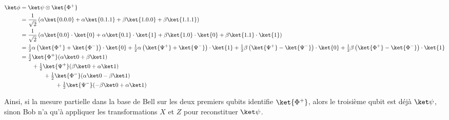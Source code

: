 \documentclass[11pt,class=report,crop=false]{standalone}
\begin{document}
\begin{align*}
\ket \phi 
  &= \ket\psi \otimes \ket{\Phi^+} \\
  &= \frac{1}{\sqrt2}\left( \alpha\ket{0.0.0} + \alpha\ket{0.1.1} + \beta\ket{1.0.0} + \beta\ket{1.1.1} \right) \\
  &= \frac{1}{\sqrt2}\left( \alpha\ket{0.0}\cdot\ket{0} + \alpha\ket{0.1}\cdot\ket{1} + \beta\ket{1.0}\cdot\ket{0} + \beta\ket{1.1}\cdot\ket{1} \right) \\  
  &= \tfrac12\alpha\left( \ket{\Phi^+}+\ket{\Phi^-} \right)\cdot\ket{0} 
  + \tfrac12\alpha\left( \ket{\Psi^+}+\ket{\Psi^-} \right)\cdot\ket{1} 
  + \tfrac12\beta\left( \ket{\Psi^+}-\ket{\Psi^-} \right)\cdot\ket{0} 
  + \tfrac12\beta\left( \ket{\Phi^+}-\ket{\Phi^-} \right)\cdot\ket{1}  \\  
  &= \tfrac12\ket{\Phi^+} (\alpha\ket0+\beta\ket1) \\
  &\qquad +\tfrac12\ket{\Psi^+}(\beta\ket0+\alpha\ket1) \\
  &\qquad\qquad +\tfrac12\ket{\Phi^-}(\alpha\ket0-\beta\ket1) \\
  &\qquad\qquad\qquad +\tfrac12\ket{\Psi^-}(-\beta\ket0+\alpha\ket1)  \\
\end{align*}

Ainsi, si la mesure partielle dans la base de Bell sur les deux premiers qubits identifie $\ket{\Phi^+}$, alors le troisième qubit est déjà $\ket\psi$, sinon Bob n'a qu'à appliquer les transformations $X$ et $Z$ pour reconstituer $\ket\psi$.
\end{document}
